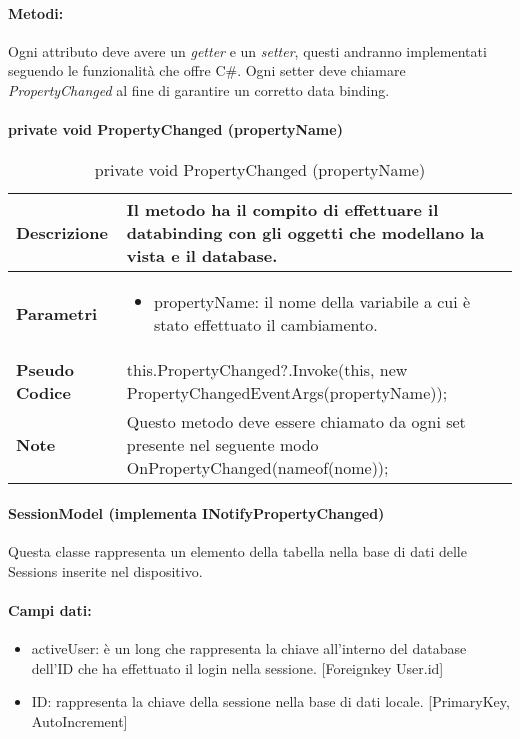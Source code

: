 \paragraph{Metodi:}
Ogni attributo deve avere un \emph{getter} e un \emph{setter}, questi andranno implementati seguendo le funzionalità che offre C\#. Ogni setter deve chiamare \emph{PropertyChanged} al fine di garantire un corretto data binding.



\paragraph{private void PropertyChanged (propertyName)}
        \begin{center}
            \begin{longtable}{|p{3cm}|p{9cm}|}%
            \caption{private void PropertyChanged (propertyName)}
            \endfirsthead
            \endhead
            \hline
            \textbf{Descrizione} & Il metodo ha il compito di effettuare il databinding con gli oggetti che modellano la vista e il database.\\
            \hline
            \textbf{Parametri} &      
            \begin{itemize}
                \item propertyName: il nome della variabile a cui è stato effettuato il cambiamento.
            \end{itemize}
            \\
            \hline
            \textbf{Pseudo Codice} & 
            this.PropertyChanged?.Invoke(this, 
                new PropertyChangedEventArgs(propertyName));\newline
            \\
            \hline
            \textbf{Note} & 
            Questo metodo deve essere chiamato da ogni set presente nel seguente modo 
            OnPropertyChanged(nameof(nome));
            \\
            \hline
            \end{longtable}
            \end{center}

\paragraph{SessionModel (implementa INotifyPropertyChanged)}
Questa classe rappresenta un elemento della tabella nella base di dati delle Sessions inserite nel dispositivo.
\paragraph{Campi dati:}
\begin{itemize}
    \item activeUser: è un long che rappresenta la chiave all’interno del database dell’ID che ha effettuato il login nella sessione. [Foreignkey User.id]
    \item ID: rappresenta la chiave della sessione nella base di dati locale. [PrimaryKey, AutoIncrement]
\end{itemize}

